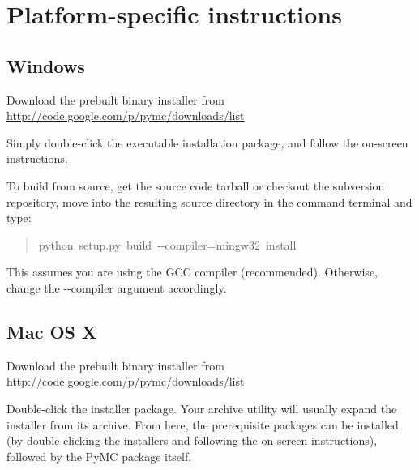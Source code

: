 
\hypertarget{platform-specific-instructions}{}
\section*{Platform-specific instructions}



\hypertarget{windows}{}
\subsection*{Windows}
\begin{list}{.}
{
\setlength{\rightmargin}{\leftmargin}
}
\item {} 
Download the prebuilt binary installer from \href{http://code.google.com/p/pymc/downloads/list}{http://code.google.com/p/pymc/downloads/list}

\item {} 
Simply double-click the executable installation package, and follow the on-screen instructions.

\end{list}

To build from source, get the source code tarball or checkout the subversion
repository, move into the resulting source directory in the command terminal
and type:
\begin{quote}{\ttfamily \raggedright \noindent
python~setup.py~build~-{}-compiler=mingw32~install
}\end{quote}

This assumes you are using the GCC compiler (recommended). Otherwise,
change the -{}-compiler argument accordingly.



\hypertarget{mac-os-x}{}
\subsection*{Mac OS X}
\setcounter{listcnt0}{0}
\begin{list}{.}
{
\setlength{\rightmargin}{\leftmargin}
}
\item {} 
Download the prebuilt binary installer from \href{http://code.google.com/p/pymc/downloads/list}{http://code.google.com/p/pymc/downloads/list}

\item {} 
Double-click the installer package. Your archive utility will usually expand
the installer from its archive. From here, the prerequisite packages can be
installed (by double-clicking the installers and following the on-screen
instructions), followed by the PyMC package itself.

\end{list}

